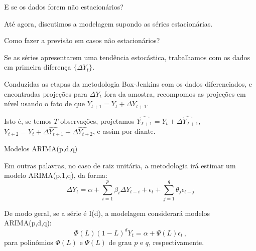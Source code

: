 \documentclass[11pt]{beamer}
\newenvironment{halfwideitemize}{\itemize\addtolength{\itemsep}{0.5em}}{\enditemize}
\begin{document}
\begin{frame}{E se os dados forem não estacionários?}
	\begin{halfwideitemize}
		\item Até agora, discutimos a modelagem supondo as séries estacionárias.
		\begin{halfwideitemize}
			\item Como fazer a previsão em casos não estacionários?
		\end{halfwideitemize}
		\item Se as séries apresentarem uma tendência estocástica, trabalhamos com os dados em primeira diferença $\{\Delta Y_t\}$. 
		
		\item Conduzidas as etapas da metodologia Box-Jenkins com os dados diferenciados, e encontradas projeções para $\Delta Y_t$ fora da amostra, recompomos as projeções  em nível usando o fato de que $Y_{t+1} = Y_t + \Delta Y_{t+1}$.
		\begin{halfwideitemize}
			\item Isto é, se temos $T$ observações, projetamos $\widehat{Y_{T+1}} = Y_t + \widehat{{\Delta Y_{T+1}}}$,  $Y_{t+2} = Y_t + \widehat{\Delta Y_{t+1}} + \widehat{\Delta Y_{t+2}}$, e assim por diante.
		\end{halfwideitemize}
		\end{halfwideitemize}
\end{frame}
\begin{frame}{Modelos ARIMA(p,d,q)}
	\begin{halfwideitemize}
				\item Em outras palavras, no caso de raiz unitária, a metodologia irá estimar um modelo {\color{blue}ARIMA(p,1,q)}, da forma:
		\begin{equation*}
			\Delta Y_t =\alpha + \sum_{i=1}^p \beta_i \Delta Y_{t-i} + \epsilon_t + \sum_{j=1}^q \theta_j \epsilon_{t-j}
		\end{equation*}
		\item De modo geral, se a série é I(d), a modelagem considerará modelos {\color{blue}ARIMA(p,d,q)}:
		$$\Phi(L)(1-L)^d Y_t =  \alpha + \Psi(L)\epsilon_t \, ,$$
		para polinômios $\Phi(L)$ e $\Psi(L)$ de grau $p$ e $q$, respectivamente.

	\end{halfwideitemize}
\end{frame}
\end{document}
